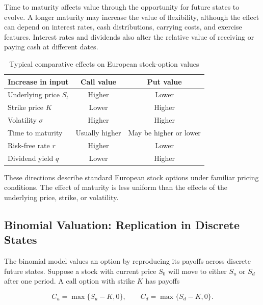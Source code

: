 Time to maturity affects value through the opportunity for future states to evolve. A longer maturity may increase the value of flexibility, although the effect can depend on interest rates, cash distributions, carrying costs, and exercise features. Interest rates and dividends also alter the relative value of receiving or paying cash at different dates.

\begin{table}[H]
\centering
\caption{Typical comparative effects on European stock-option values}
\label{tab:ch18-option-value-determinants}
\begin{tabular}{@{}lcc@{}}
\toprule
\textbf{Increase in input} & \textbf{Call value} & \textbf{Put value} \\
\midrule
Underlying price \(S_t\) & Higher & Lower \\
Strike price \(K\) & Lower & Higher \\
Volatility \(\sigma\) & Higher & Higher \\
Time to maturity & Usually higher & May be higher or lower \\
Risk-free rate \(r\) & Higher & Lower \\
Dividend yield \(q\) & Lower & Higher \\
\bottomrule
\end{tabular}
\end{table}

These directions describe standard European stock options under familiar pricing conditions. The effect of maturity is less uniform than the effects of the underlying price, strike, or volatility.

\subsection[Binomial Valuation: Replication in Discrete States]{Binomial Valuation: Replication in Discrete States}

The binomial model values an option by reproducing its payoffs across discrete future states. Suppose a stock with current price \(S_0\) will move to either \(S_u\) or \(S_d\) after one period. A call option with strike \(K\) has payoffs

\begin{equation*}
C_u=\max\{S_u-K,0\},
\qquad
C_d=\max\{S_d-K,0\}.
\label{eq:ch18-binomial-call-payoffs}
\end{equation*}

